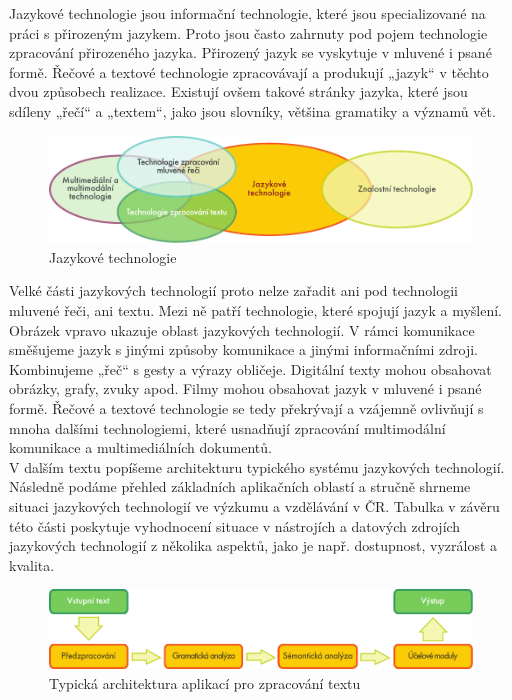 \documentclass[]{../../metanetpaper}
\begin{document}
\begin{multicols}{2}

Jazykové technologie jsou informační technologie, které jsou specializované na práci s přirozeným jazykem. Proto jsou často zahrnuty pod pojem technologie zpracování přirozeného jazyka. Přirozený jazyk se vyskytuje v mluvené i psané formě. Řečové a textové technologie zpracovávají a produkují „jazyk“ v těchto dvou způsobech realizace. Existují ovšem takové stránky jazyka, které jsou sdíleny „řečí“ a „textem“, jako jsou slovníky, většina gramatiky a významů vět. 
\begin{figure}[htb]
  \center
  \includegraphics[width=\textwidth]{../_media/czech/language_technologies}
  \caption{Jazykové technologie}
  \label{fig:ltincontext_en}
\end{figure}
Velké části jazykových technologií proto nelze zařadit ani pod technologii mluvené řeči, ani textu. Mezi ně patří technologie, které spojují jazyk a myšlení. Obrázek vpravo ukazuje oblast jazykových technologií. V rámci komunikace směšujeme jazyk s jinými způsoby komunikace a jinými informačními zdroji. Kombinujeme „řeč“ s gesty a výrazy obličeje. Digitální texty mohou obsahovat obrázky, grafy, zvuky apod. Filmy mohou obsahovat jazyk v mluvené i psané formě. Řečové a textové technologie se tedy překrývají a vzájemně ovlivňují s mnoha dalšími technologiemi, které usnadňují zpracování multimodální komunikace a multimediálních dokumentů.\\
V dalším textu popíšeme architekturu typického systému jazykových technologií. Následně podáme přehled základních aplikačních oblastí a stručně shrneme situaci jazykových technologií ve výzkumu a vzdělávání v ČR. Tabulka v závěru této části poskytuje vyhodnocení situace v nástrojích a datových zdrojích jazykových technologií z několika aspektů, jako je např. dostupnost, vyzrálost a kvalita.
\begin{figure}[b]
  \center
  \includegraphics[width=\textwidth]{../_media/czech/text_processing_app_architecture}
  \caption{Typická architektura aplikací pro zpracování textu}
  \label{fig:textprocessingarch_en}
\end{figure}

\end{multicols}
\end{document}
